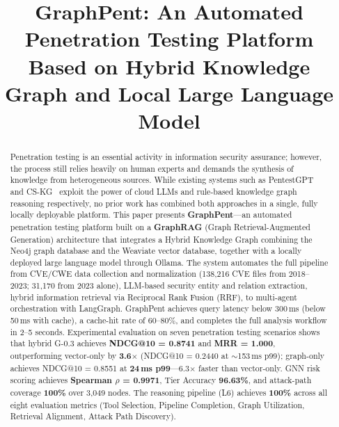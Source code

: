 \documentclass[conference]{IEEEtran}
\begin{document}
\title{GraphPent: An Automated Penetration Testing Platform\\
Based on Hybrid Knowledge Graph and Local Large Language Model}

\author{
}

\maketitle

\begin{abstract}
Penetration testing is an essential activity in information security assurance;
however, the process still relies heavily on human experts and demands the
synthesis of knowledge from heterogeneous sources.
While existing systems such as PentestGPT~\cite{deng2024pentestgpt} and
CS-KG~\cite{pan2025cskg} exploit the power of cloud LLMs and rule-based
knowledge graph reasoning respectively, no prior work has combined both
approaches in a single, fully locally deployable platform.
This paper presents \textbf{GraphPent}—an automated penetration testing
platform built on a \textbf{GraphRAG} (Graph Retrieval-Augmented Generation)
architecture that integrates a Hybrid Knowledge Graph combining the Neo4j graph
database and the Weaviate vector database, together with a locally deployed
large language model through Ollama.
The system automates the full pipeline from CVE/CWE data collection and
normalization (138,216 CVE files from 2018--2023; 31,170 from 2023 alone),
LLM-based security entity and
relation extraction, hybrid information retrieval via Reciprocal Rank Fusion
(RRF), to multi-agent orchestration with LangGraph.
GraphPent achieves query latency below 300\,ms (below 50\,ms with cache),
a cache-hit rate of 60--80\%, and completes the full analysis workflow in
2--5 seconds.
Experimental evaluation on seven penetration testing scenarios shows that
hybrid G-0.3 achieves \textbf{NDCG@10 = 0.8741} and \textbf{MRR = 1.000},
outperforming vector-only by \textbf{3.6$\times$} (NDCG@10 = 0.2440 at
$\sim$153\,ms p99); graph-only achieves NDCG@10 = 0.8551 at \textbf{24\,ms
p99}---6.3$\times$ faster than vector-only.
GNN risk scoring achieves \textbf{Spearman $\rho$ = 0.9971}, Tier Accuracy
\textbf{96.63\%}, and attack-path coverage \textbf{100\%} over 3,049 nodes.
The reasoning pipeline (L6) achieves \textbf{100\%} across all eight
evaluation metrics (Tool Selection, Pipeline Completion, Graph Utilization,
Retrieval Alignment, Attack Path Discovery).
\end{abstract}
\end{document}
